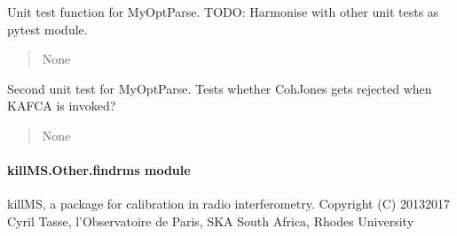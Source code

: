 \documentclass[letterpaper,10pt,english]{sphinxmanual}
\begin{document}
\begin{fulllineitems}
\label{\detokenize{api/killMS.Other:killMS.Other.PrintOptParse.test}}
\pysigstartsignatures
{}
\pysigstopsignatures
\sphinxAtStartPar
Unit test function for MyOptParse.
TODO: Harmonise with other unit tests as pytest module.
\begin{quote}\begin{description}
\sphinxAtStartPar
None

\end{description}\end{quote}

\end{fulllineitems}


\begin{fulllineitems}
\label{\detokenize{api/killMS.Other:killMS.Other.PrintOptParse.test2}}
\pysigstartsignatures
{}
\pysigstopsignatures
\sphinxAtStartPar
Second unit test for MyOptParse.
Tests whether CohJones gets rejected when KAFCA is invoked?
\begin{quote}\begin{description}
\sphinxAtStartPar
None

\end{description}\end{quote}

\end{fulllineitems}



\paragraph{killMS.Other.findrms module}
\label{\detokenize{api/killMS.Other:module-killMS.Other.findrms}}\label{\detokenize{api/killMS.Other:killms-other-findrms-module}}
\sphinxAtStartPar
killMS, a package for calibration in radio interferometry.
Copyright (C) 2013\sphinxhyphen{}2017  Cyril Tasse, l’Observatoire de Paris,
SKA South Africa, Rhodes University
\end{document}
